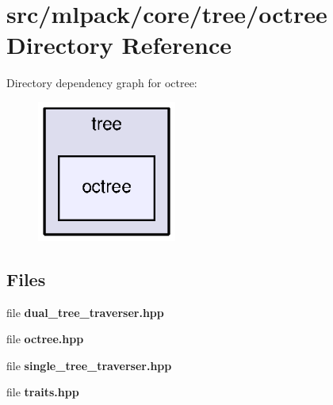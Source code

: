 \section{src/mlpack/core/tree/octree Directory Reference}
\label{dir_d6a1e83a35c0777ddb5f306ab15ead95}
Directory dependency graph for octree\+:
\nopagebreak
\begin{figure}[H]
\begin{center}
\leavevmode
\includegraphics[width=130pt]{dir_d6a1e83a35c0777ddb5f306ab15ead95_dep}
\end{center}
\end{figure}
\subsection*{Files}
\begin{DoxyCompactItemize}
\item 
file {\bf dual\+\_\+tree\+\_\+traverser.\+hpp}
\item 
file {\bf octree.\+hpp}
\item 
file {\bf single\+\_\+tree\+\_\+traverser.\+hpp}
\item 
file {\bf traits.\+hpp}
\end{DoxyCompactItemize}
